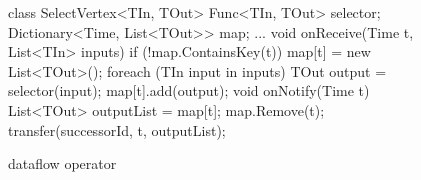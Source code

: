 \begin{figure}[t!]
\begin{numcodejava}
class SelectVertex<TIn, TOut> {
  Func<TIn, TOut> selector;
  Dictionary<Time, List<TOut>> map;
  ...
  void onReceive(Time t, List<TIn> inputs) {
    if (!map.ContainsKey(t))
       map[t] = new List<TOut>();
    foreach (TIn input in inputs) {
      TOut output = selector(input);
      map[t].add(output);
    }
  }
  void onNotify(Time t) {
     List<TOut> outputList = map[t];
     map.Remove(t);
     transfer(successorId, t, outputList); 
  }
}
\end{numcodejava}
\caption{ dataflow operator}
\label{fig:motivating-eg}
\vspace*{-0.2in}
\end{figure}
